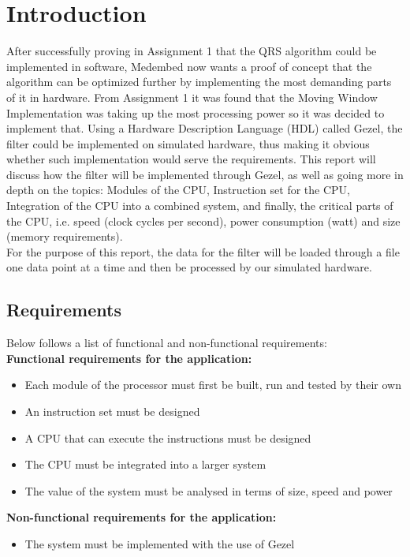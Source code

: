 \documentclass[12pt,a4paper]{article}
\begin{document}
\section{Introduction}
	After successfully proving in Assignment 1 that the QRS algorithm could be implemented in software, Medembed now wants a proof of concept that the algorithm can be optimized further by implementing the most demanding parts of it in hardware. From Assignment 1 it was found that the Moving Window Implementation was taking up the most processing power so it was decided to implement that. Using a Hardware Description Language (HDL) called Gezel, the filter could be implemented on simulated hardware, thus making it obvious whether such implementation would serve the requirements.
	This report will discuss how the filter will be implemented through Gezel, as well as going more in depth on the topics: Modules of the CPU, Instruction set for the CPU, Integration of the CPU into a combined system, and finally, the critical parts of the CPU, i.e. speed (clock cycles per second), power consumption (watt) and size (memory requirements).\\
	For the purpose of this report, the data for the filter will be loaded through a file one data point at a time and then be processed by our simulated hardware.\\
	
\subsection{Requirements}
Below follows a list of functional and non-functional requirements:\\

\textbf{ Functional requirements for the application:}
\begin{itemize}
	\item Each module of the processor must first be built, run and tested by their own
	\item An instruction set must be designed
	\item A CPU that can execute the instructions must be designed
	\item The CPU must be integrated into a larger system
	\item The value of the system must be analysed in terms of size, speed and power

\end{itemize}
\textbf{Non-functional requirements for the application:}
\begin {itemize}
	\item The system must be implemented with the use of Gezel
\end{itemize}
\end{document}
